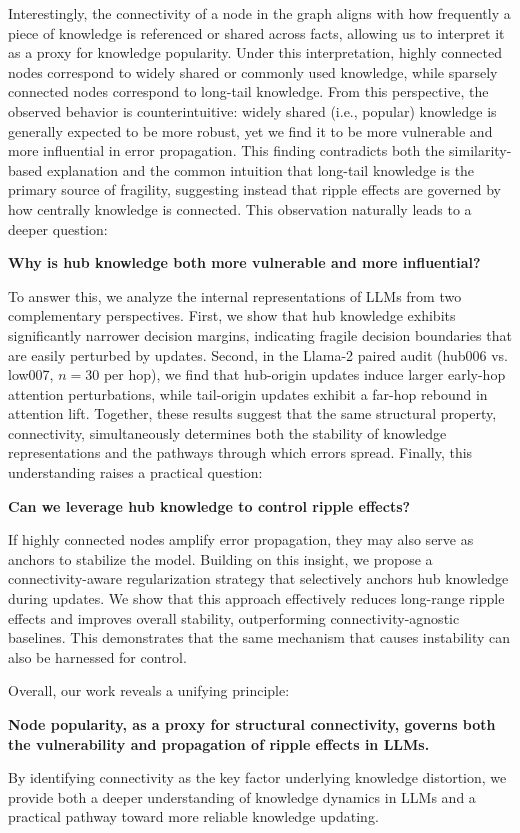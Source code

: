 Interestingly, the connectivity of a node in the graph aligns with how frequently a piece of knowledge is referenced or shared across facts, allowing us to interpret it as a proxy for knowledge popularity. 
Under this interpretation, highly connected nodes correspond to widely shared or commonly used knowledge, while sparsely connected nodes correspond to long-tail knowledge.
From this perspective, the observed behavior is counterintuitive: widely shared (i.e., popular) knowledge is generally expected to be more robust, yet we find it to be more vulnerable and more influential in error propagation. 
This finding contradicts both the similarity-based explanation and the common intuition that long-tail knowledge is the primary source of fragility, suggesting instead that ripple effects are governed by how centrally knowledge is connected. 
This observation naturally leads to a deeper question:

\textbf{Why is hub knowledge both more vulnerable and more influential?}


To answer this, we analyze the internal representations of LLMs from two complementary perspectives. First, we show that hub knowledge exhibits significantly narrower decision margins, indicating fragile decision boundaries that are easily perturbed by updates. Second, in the Llama-2 paired audit (hub006 vs. low007, $n=30$ per hop), we find that hub-origin updates induce larger early-hop attention perturbations, while tail-origin updates exhibit a far-hop rebound in attention lift. Together, these results suggest that the same structural property, connectivity, simultaneously determines both the stability of knowledge representations and the pathways through which errors spread.
Finally, this understanding raises a practical question:


\textbf{Can we leverage hub knowledge to control ripple effects?}


If highly connected nodes amplify error propagation, they may also serve as anchors to stabilize the model. Building on this insight, we propose a connectivity-aware regularization strategy that selectively anchors hub knowledge during updates. We show that this approach effectively reduces long-range ripple effects and improves overall stability, outperforming connectivity-agnostic baselines. This demonstrates that the same mechanism that causes instability can also be harnessed for control.

Overall, our work reveals a unifying principle:

\textbf{Node popularity, as a proxy for structural connectivity, governs both the vulnerability and propagation of ripple effects in LLMs.}

By identifying connectivity as the key factor underlying knowledge distortion, we provide both a deeper understanding of knowledge dynamics in LLMs and a practical pathway toward more reliable knowledge updating.